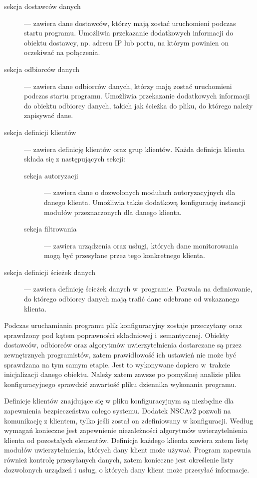 \begin{description}
\item[sekcja dostawców danych] --- zawiera dane dostawców, którzy mają
  zostać uruchomieni podczas startu programu. Umożliwia przekazanie
  dodatkowych informacji do obiektu dostawcy, np. adresu IP lub portu,
  na którym powinien on oczekiwać na połączenia. 
\item[sekcja odbiorców danych] --- zawiera dane odbiorców danych, którzy
  mają zostać uruchomieni podczas startu programu. Umożliwia
  przekazanie dodatkowych informacji do obiektu odbiorcy danych,
  takich jak ścieżka do pliku, do którego należy zapisywać dane. 
\item[sekcja definicji klientów] --- zawiera definicję klientów oraz grup
  klientów. Każda definicja klienta składa się z następujących sekcji:
  \begin{description}
  \item[sekcja autoryzacji] --- zawiera dane o dozwolonych modułach
    autoryzacyjnych dla danego klienta. Umożliwia także dodatkową
    konfigurację instancji modułów przeznaczonych dla danego klienta.
  \item[sekcja filtrowania] --- zawiera urządzenia oraz usługi, których
    dane monitorowania mogą być przesyłane przez tego konkretnego
    klienta.
  \end{description}
\item[sekcja definicji ścieżek danych] --- zawiera definicję ścieżek
  danych w~programie. Pozwala na definiowanie, do którego odbiorcy
  danych mają trafić dane odebrane od wskazanego klienta.
\end{description}

Podczas uruchamiania programu plik konfiguracyjny zostaje przeczytany
oraz sprawdzony pod kątem poprawności składniowej
i~semantycznej. Obiekty dostawców, odbiorców oraz algorytmów
uwierzytelnienia dostarczane są przez zewnętrznych programistów, zatem
prawidłowość ich ustawień nie może być sprawdzana na tym samym
etapie. Jest to wykonywane dopiero w~trakcie inicjalizacji danego
obiektu. Należy zatem zawsze po pomyślnej analizie pliku
konfiguracyjnego sprawdzić zawartość pliku dziennika wykonania
programu.

Definicje klientów znajdujące się w pliku konfiguracyjnym są niezbędne
dla zapewnienia bezpieczeństwa całego systemu. Dodatek NSCAv2 pozwoli
na komunikację z klientem, tylko jeśli został on zdefiniowany w
konfiguracji. Według wymagań konieczne jest zapewnienie niezależności
algorytmów uwierzytelnienia klienta od pozostałych
elementów. Definicja każdego klienta zawiera zatem listę modułów
uwierzytelnienia, których dany klient może używać. Program zapewnia
również kontrolę przesyłanych danych, zatem konieczne jest określenie
listy dozwolonych urządzeń i usług, o których dany klient może
przesyłać informacje.

